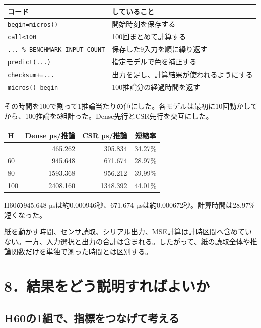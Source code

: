 \documentclass[
  11pt,
  a4paper,
]{article}
\begin{document}
\begin{longtable}[]{@{}ll@{}}
\toprule\noalign{}
コード & していること \\
\midrule\noalign{}
\endhead
\bottomrule\noalign{}
\endlastfoot
\texttt{begin=micros()} & 開始時刻を保存する \\
\texttt{call\textless{}100} & 100回まとめて計算する \\
\texttt{...\ \%\ BENCHMARK\_INPUT\_COUNT} &
保存した9入力を順に繰り返す \\
\texttt{predict(...)} & 指定モデルで色を補正する \\
\texttt{checksum+=...} & 出力を足し、計算結果が使われるようにする \\
\texttt{micros()-begin} & 100推論分の経過時間を返す \\
\end{longtable}

その時間を100で割って1推論当たりの値にした。各モデルは最初に10回動かしてから、100推論を5組計った。Dense先行とCSR先行を交互にした。

\begin{longtable}[]{@{}lrrr@{}}
\toprule\noalign{}
H & Dense µs/推論 & CSR µs/推論 & 短縮率 \\
\midrule\noalign{}
\endhead
\bottomrule\noalign{}
\endlastfoot
40 & 465.262 & 305.834 & 34.27\% \\
60 & 945.648 & 671.674 & 28.97\% \\
80 & 1593.368 & 956.212 & 39.99\% \\
100 & 2408.160 & 1348.392 & 44.01\% \\
\end{longtable}

H60の945.648 µsは約0.000946秒、671.674
µsは約0.000672秒。計算時間は28.97\%短くなった。

紙を動かす時間、センサ読取、シリアル出力、MSE計算は計時区間へ含めていない。一方、入力選択と出力の合計は含まれる。したがって、紙の読取全体や推論関数だけを単独で測った時間とは区別する。

\newpage

\section{8．結果をどう説明すればよいか}\label{ux7d50ux679cux3092ux3069ux3046ux8aacux660eux3059ux308cux3070ux3088ux3044ux304b}

\subsection{H60の1組で、指標をつなげて考える}\label{h60ux306e1ux7d44ux3067ux6307ux6a19ux3092ux3064ux306aux3052ux3066ux8003ux3048ux308b}
\end{document}
